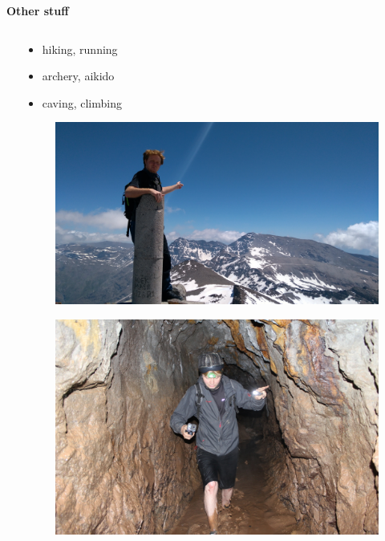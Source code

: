 \documentclass[xcolor=dvipsnames]{beamer}
\begin{document}
\begin{frame}{\bf Other stuff}
\begin{columns}
\begin{column}{0.5\textwidth}
\end{column}
\begin{column}{0.5\textwidth}  %

\begin{itemize}
  \item hiking, running
  \item archery, aikido
  \item caving, climbing
\end{itemize}

    \begin{figure}[!htb]
      \centering
      \includegraphics[scale=0.08]{../../pictures/me_01.jpg}
    \end{figure}
    \begin{figure}[!htb]
      \centering
      \includegraphics[scale=0.1]{../../pictures/me_02.jpg}
    \end{figure}


\end{column}
\end{columns}


\end{frame}
\end{document}
